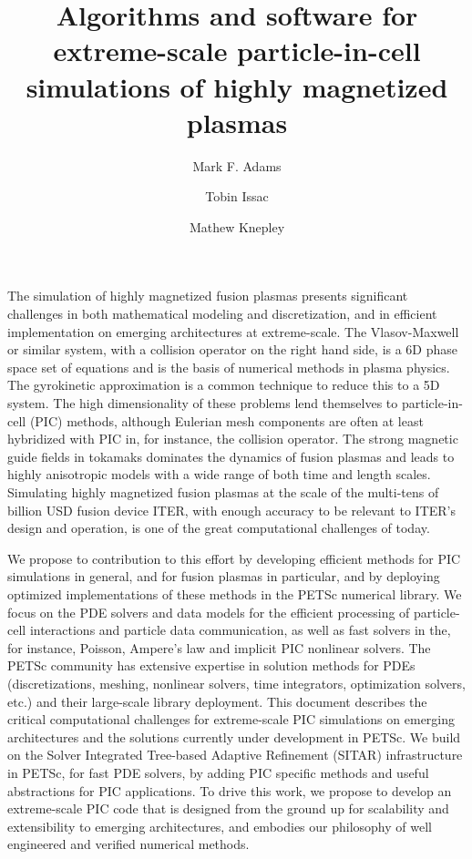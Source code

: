 \documentclass[review]{siamart}
\title{Algorithms and software for extreme-scale particle-in-cell simulations of highly magnetized plasmas}
\author{Mark F. Adams\and Tobin Issac\and Mathew Knepley}
\begin{document}
\maketitle

The simulation of highly magnetized fusion plasmas presents significant challenges in both mathematical modeling and discretization, and in efficient implementation on emerging architectures at extreme-scale.
The Vlasov-Maxwell or similar system, with a collision operator on the right hand side, is a 6D phase space set of equations and is the basis of numerical methods in plasma physics.
The gyrokinetic approximation is a common technique to reduce this to a 5D system.
The high dimensionality of these problems lend themselves to particle-in-cell (PIC) methods, although Eulerian mesh components are often at least hybridized with PIC in, for instance, the collision operator.
The strong magnetic guide fields in tokamaks dominates the dynamics of fusion plasmas and leads to highly anisotropic models with a wide range of both time and length scales.
Simulating highly magnetized fusion plasmas at the scale of the multi-tens of billion USD fusion device ITER, with enough accuracy to be relevant to ITER's design and operation, is one of the great computational challenges of today.

We propose to contribution to this effort by developing efficient methods for PIC simulations in general, and for fusion plasmas in particular, and by deploying optimized implementations of these methods in the PETSc numerical library.
We focus on the PDE solvers and data models for the efficient processing of particle-cell interactions and particle data communication, as well as fast solvers in the, for instance, Poisson, Ampere's law and implicit PIC nonlinear solvers.
The PETSc community has extensive expertise in solution methods for PDEs (discretizations, meshing,  nonlinear solvers, time integrators, optimization solvers, etc.) and their large-scale library deployment.
This document describes the critical computational challenges for extreme-scale PIC simulations on emerging architectures and the solutions currently under development in PETSc.
We build on the Solver Integrated Tree-based Adaptive Refinement (SITAR) infrastructure in PETSc, for fast PDE solvers, by adding PIC specific methods and useful abstractions for PIC applications.
To drive this work, we propose to develop an extreme-scale PIC code that is designed from the ground up for scalability and extensibility to emerging architectures, and embodies our philosophy of well engineered and verified numerical methods.
\end{document}
